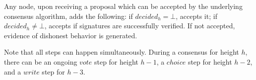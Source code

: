 \begin{itemize}
Any node, upon receiving a proposal which can be accepted by the underlying consensus algorithm, adds the following: if $decided_h = \bot$, accepts it;  if $decided_h \neq \bot$, accepts if signatures are successfully verified. If not accepted, evidence of dishonest behavior is generated.


\end{itemize}




Note that all steps can happen simultaneously. During a consensus for height $h$, there can be an ongoing $vote$ step for height $h-1$, a $choice$ step for height $h-2$, and a $write$ step for $h-3$. %




